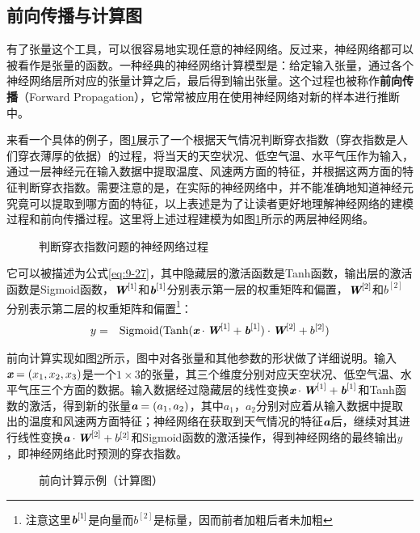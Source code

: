 
\subsection{前向传播与计算图}

\parinterval 有了张量这个工具，可以很容易地实现任意的神经网络。反过来，神经网络都可以被看作是张量的函数。一种经典的神经网络计算模型是：给定输入张量，通过各个神经网络层所对应的张量计算之后，最后得到输出张量。这个过程也被称作{\small\sffamily\bfseries{前向传播}}（Forward Propagation），它常常被应用在使用神经网络对新的样本进行推断中。

\parinterval 来看一个具体的例子，图\ref{fig:9-37}展示了一个根据天气情况判断穿衣指数（穿衣指数是人们穿衣薄厚的依据）的过程，将当天的天空状况、低空气温、水平气压作为输入，通过一层神经元在输入数据中提取温度、风速两方面的特征，并根据这两方面的特征判断穿衣指数。需要注意的是，在实际的神经网络中，并不能准确地知道神经元究竟可以提取到哪方面的特征，以上表述是为了让读者更好地理解神经网络的建模过程和前向传播过程。这里将上述过程建模为如图\ref{fig:9-37}所示的两层神经网络。

\begin{figure}[htp]
\centering

\caption{判断穿衣指数问题的神经网络过程}
\label{fig:9-37}
\end{figure}

\parinterval 它可以被描述为公式\eqref{eq:9-27}，其中隐藏层的激活函数是Tanh函数，输出层的激活函数是Sigmoid函数，${\textbf{\em W}}^{[1]}$和${\textbf{\em b}}^{[1]}$分别表示第一层的权重矩阵和偏置，${\textbf{\em W}}^{[2]}$和$b^{[2]}$分别表示第二层的权重矩阵和偏置\footnote{注意这里${\textbf{\em b}}^{[1]}$是向量而$b^{[2]}$是标量，因而前者加粗后者未加粗}：
\begin{eqnarray}
y&=&{\textrm{Sigmoid}}({\textrm{Tanh}}({\textbf{\em x}}\cdot {\textbf{\em W}}^{[1]}+{\textbf{\em b}}^{[1]})\cdot {\textbf{\em W}}^{[2]}+ b^{[2]} )
\label{eq:9-27}
\end{eqnarray}

\parinterval 前向计算实现如图\ref{fig:9-38}所示，图中对各张量和其他参数的形状做了详细说明。输入$ {\textbf{\em x}}=(x_1,x_2,x_3) $是一个$1\times 3$的张量，其三个维度分别对应天空状况、低空气温、水平气压三个方面的数据。输入数据经过隐藏层的线性变换$ {\textbf{\em x}}\cdot {\textbf{\em W}}^{[1]}+{\textbf{\em b}}^{[1]}$和Tanh函数的激活，得到新的张量$ {\textbf{\em a}}=(a_1,a_2) $，其中$a_1$，$a_2$分别对应着从输入数据中提取出的温度和风速两方面特征；神经网络在获取到天气情况的特征$ {\textbf{\em a}}$后，继续对其进行线性变换${\textbf{\em a}}\cdot {\textbf{\em W}}^{[2]}+ b^{[2]} $和Sigmoid函数的激活操作，得到神经网络的最终输出$ y $，即神经网络此时预测的穿衣指数。
\begin{figure}[htp]
\centering

\caption{前向计算示例（计算图）}
\label{fig:9-38}
\end{figure}

